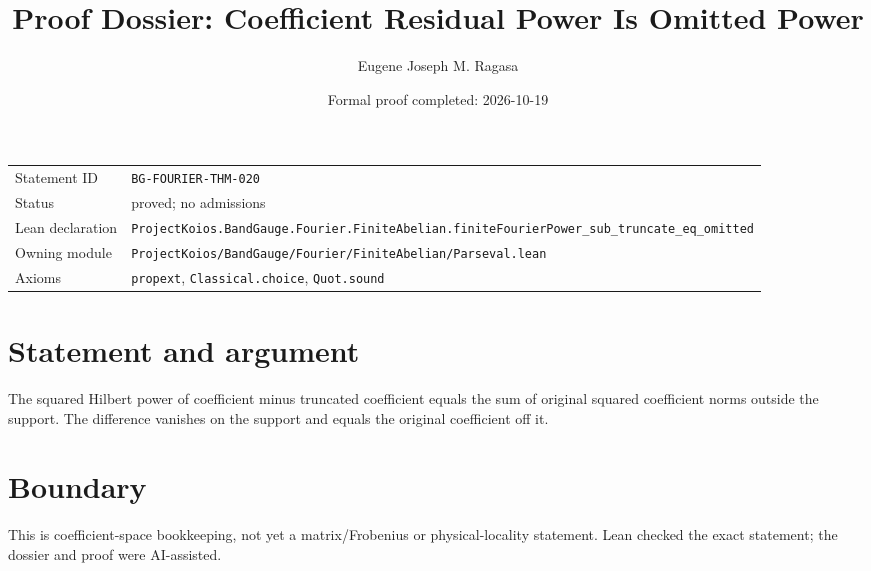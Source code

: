 \documentclass[11pt]{article}
\title{Proof Dossier: Coefficient Residual Power Is Omitted Power}
\author{Eugene Joseph M. Ragasa}
\date{Formal proof completed: 2026-10-19}
\begin{document}
\maketitle
\noindent\begin{tabularx}{\textwidth}{@{}lX@{}}\toprule
Statement ID & \texttt{BG-FOURIER-THM-020} \\
Status & proved; no admissions \\
Lean declaration & \texttt{ProjectKoios.BandGauge.Fourier.FiniteAbelian.}\newline\texttt{finiteFourierPower\_sub\_truncate\_eq\_omitted} \\
Owning module & \texttt{ProjectKoios/BandGauge/Fourier/FiniteAbelian/Parseval.lean} \\
Axioms & \texttt{propext}, \texttt{Classical.choice}, \texttt{Quot.sound} \\
\bottomrule\end{tabularx}
\section{Statement and argument}
The squared Hilbert power of coefficient minus truncated coefficient equals the sum of original squared coefficient norms outside the support. The difference vanishes on the support and equals the original coefficient off it.
\section{Boundary}
This is coefficient-space bookkeeping, not yet a matrix/Frobenius or physical-locality statement. Lean checked the exact statement; the dossier and proof were AI-assisted.
\end{document}
